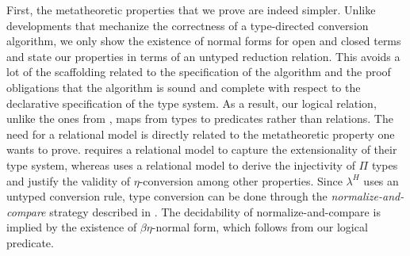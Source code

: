 \documentclass[acmsmall,screen=true,
\ifpublic review=false\else,review=true\fi
  ,anonymous=\ifanonymous true\else false\fi]{acmart}
\newcommand{\lang}{$\lambda^H$\xspace}
\newcommand{\scw}[1]{}
\newcommand{\yl}[1]{}
\begin{document}
First, the metatheoretic properties that we prove are indeed simpler.  Unlike
developments that mechanize the correctness of a type-directed conversion
algorithm, we only show the existence of normal forms for open and closed
terms and state our properties in terms of an untyped reduction relation. This
avoids a lot of the scaffolding related to the specification of the algorithm
and the proof obligations that the algorithm is sound and complete with
respect to the declarative specification of the type system.
As a result, our logical relation, unlike the ones from \citet{decagda,
  nbeincoq, martin-lof-a-la-coq, anand2014towards}, maps from types to
predicates rather than relations. \scw{How does this follow? Why do we need unary relations where they need binary relations?} The need for a relational model is
directly related to the metatheoretic property one wants to
prove. \citet{anand2014towards} requires a relational model to capture
the extensionality of their type system, whereas \citet{decagda,
  martin-lof-a-la-coq, nbeincoq} uses a relational model to derive the
injectivity of $\Pi$ types and justify the validity of
$\eta$-conversion among other properties.
Since \lang{} uses an untyped conversion rule, type conversion can be
done through the \emph{normalize-and-compare}
strategy described in \citet{pierce2004advanced}. The decidability of
normalize-and-compare is implied by the existence of
$\beta\eta$-normal form, which follows from our logical
predicate.

\scw{I'm getting confused by this paragraph. Does this reorganization sense:
  Our language is simpler than Nuprl, because it doesn't have extensional
  equality. It is simpler than Agda, because it doesn't have type-directed
  equality. Both of these cases require the definition of a binary logical
  relation, that defines a notion of semantic equality between terms. This
  relation justifies the injectivity of $\Pi$ types and justify the validity
  of $\eta$-conversion among other properties.}  \scw{Furthermore our proof is
  also simpler because we don't need prove the correctness of the NBE
  algorithm, which is used to show the decidability of Agda's type-directed
  equivalence. Therefore, we don't need to define this algorithm and show that
  it is sound and complete with respect to the type-directed
  equality. Instead, to show the decidability of our untyped equivalence, we
  need only show that terms have $\beta\eta$ normal forms. }
\yl{Makes perfect sense!}
\end{document}
